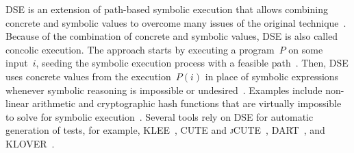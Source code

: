 \documentclass[paper=a4,%
  twoside,%
  BCOR4mm,%
  abstract=true,%
  toc=bibliography,%
  chapterprefix=true,%
  toc=bibliographynumbered,%
  open=right,%
  english,%
  pagesize=pdftex]{scrreprt}
\begin{document}

\ac{DSE} is an extension of path-based symbolic execution that allows combining concrete and symbolic values to overcome many issues of the original technique~\cite{Fraser_2013}. Because of the combination of concrete and symbolic values, \ac{DSE} is also called concolic execution. The approach starts by executing a program~$P$ on some input~$i$, seeding the symbolic execution process with a feasible path~\cite{Gupta2000,Korel1992}. Then, \ac{DSE} uses concrete values from the execution~$P(i)$ in place of symbolic expressions whenever symbolic reasoning is impossible or undesired~\cite{Cadar2005}. Examples include non-linear arithmetic and cryptographic hash functions that are virtually impossible to solve for symbolic execution~\cite{Ball2015}. Several tools rely on \ac{DSE} for automatic generation of tests, for example, \textsc{KLEE}~\cite{cadar2008klee}, \textsc{CUTE} and \textsc{jCUTE}~\cite{Sen2006}, \textsc{DART}~\cite{Godefroid_2005}, and \textsc{KLOVER}~\cite{Li2011}.
\end{document}
